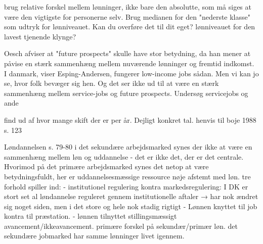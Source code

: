brug relative forskel mellem lønninger, ikke bare den absolutte, som må siges at være den vigtigste for personerne selv. Brug medianen for den "nederste klasse" som udtryk for lønniveauet. Kan du overføre det til dit eget? lønniveauet for den lavest tjenende klynge?

Oesch afviser at "future prospects" skulle have stor betydning, da han mener at påvise en stærk sammenhæng mellem nuværende lønninger og fremtid indkomst. I danmark, viser Esping-Andersen, fungerer low-income jobs sådan. Men vi kan jo se, hvor folk bevæger sig hen. Og det ser ikke ud til at være en stærk sammenhæng mellem service-jobs og future prospects. Undersøg servicejobs og ande


find ud af hvor mange skift der er per år. Dejligt konkret tal. henvis til boje 1988 s. 123


Løndannelsen s. 79-80
	i det sekundære arbejdsmarked synes der ikke at være en sammenhæng mellem løn og uddannelse - det er ikke det, der er det centrale. Hvorimod på det primære arbejdsmarked synes det netop at være betydningsfuldt, her er uddannelsesmæssige ressource nøje afstemt med løn. 
	tre forhold spiller ind:
	- institutionel regulering kontra markedsregulering: I DK er stort set al løndannelse reguleret gennem institutionelle aftaler 
	→ har nok ændret sig noget siden, men i det store og hele nok stadig rigtigt
	- Lønnen knyttet til job kontra til præstation.
	- lønnen tilnyttet stillingsmæssigt avancement/ikkeavancement. primære forskel på sekundær/primær løn. det sekundære jobmarked har samme lønninger livet igennem. 







































\fi


